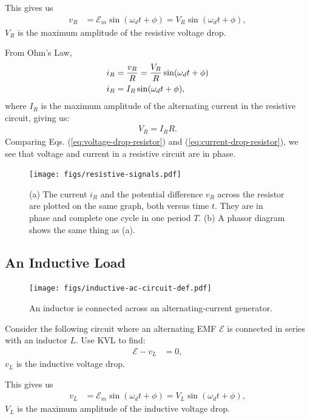 \documentclass[12pt,b4paper]{article}
\begin{document}
This gives us 
\begin{align}
    v_R&=\mathcal{E}_m\sin(\omega_d t+\phi)=V_R\sin(\omega_d t+\phi),\label{eq:voltage-drop-resistor}
\end{align}
$V_R$ is the maximum amplitude of the resistive voltage drop.

From Ohm's Law,
\begin{align}
    i_R&=\frac{v_R}{R}=\frac{V_R}{R}\sin(\omega_d t+\phi)\notag\\
    i_R&=I_R\sin(\omega_d t+\phi),\label{eq:current-drop-resistor}
\end{align}
where $I_R$ is the maximum amplitude of the alternating current in the resistive circuit, giving us:
\begin{align}
    V_R=I_RR.
\end{align}
Comparing Eqs. (\ref{eq:voltage-drop-resistor}) and (\ref{eq:current-drop-resistor}), we see that voltage and current in a resistive circuit are in phase.
\begin{figure}[H]
    \centering
    \texttt{[image: figs/resistive-signals.pdf]}
    \caption{(a) The current $i_R$ and the potential difference $v_R$ across the resistor are plotted on the same graph, both versus time $t$. They are in phase and complete one cycle in one period $T$. (b) A phasor diagram shows the same thing as (a).}
    \label{fig:resistive-signals}
\end{figure}
\subsection*{An Inductive Load}
\begin{figure}[H]
    \centering
    \texttt{[image: figs/inductive-ac-circuit-def.pdf]}
    \caption{An inductor is connected across an alternating-current generator.}
    \label{fig:inductive-ac-circuit-def}
\end{figure}
Consider the following circuit where an alternating EMF $\mathcal{E}$ is connected in series with an inductor $L$. Use KVL to find:
\begin{align}
    \mathcal{E}-v_L&=0,
\end{align}
$v_L$ is the inductive voltage drop.

This gives us 
\begin{align}
    v_L&=\mathcal{E}_m\sin(\omega_d t+\phi)=V_L\sin(\omega_d t+\phi),\label{eq:voltage-drop-inductor}
\end{align}
$V_L$ is the maximum amplitude of the inductive voltage drop.
\end{document}
